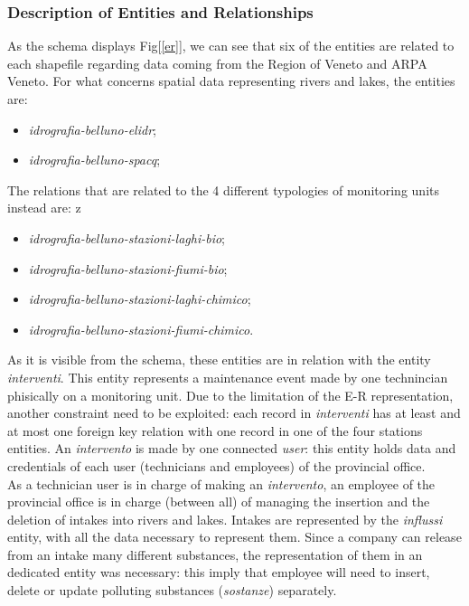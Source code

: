 \subsubsection{Description of Entities and Relationships}
As the schema displays Fig[\ref{er}], we can see that six of the entities are related to each shapefile regarding data coming from the Region of Veneto and ARPA Veneto.
For what concerns spatial data representing rivers and lakes, the entities are:
\begin{itemize}
    \item \textit{idrografia-belluno-elidr};
    \item \textit{idrografia-belluno-spacq};
\end{itemize}
The relations that are related to the 4 different typologies of monitoring units instead are:
z\begin{itemize}
    \item \textit{idrografia-belluno-stazioni-laghi-bio};
    \item \textit{idrografia-belluno-stazioni-fiumi-bio};
    \item \textit{idrografia-belluno-stazioni-laghi-chimico};
    \item \textit{idrografia-belluno-stazioni-fiumi-chimico}.
\end{itemize}
As it is visible from the schema, these entities are in relation with the entity \textit{interventi}. This entity represents a maintenance event made by one technincian phisically on a monitoring unit. Due to the limitation of the E-R representation, another constraint need to be exploited: each record in \textit{interventi} has at least and at most one foreign key relation with one record in one of the four stations entities.
An \textit{intervento} is made by one connected \textit{user}: this entity holds data and credentials of each user (technicians and employees) of the provincial office. \\
As a technician user is in charge of making an \textit{intervento}, an employee of the provincial office is in charge (between all) of managing the insertion and the deletion of intakes into rivers and lakes. Intakes are represented by the \textit{influssi} entity, with all the data necessary to represent them. Since a company can release from an intake many different substances, the representation of them in an dedicated entity was necessary: this imply that employee will need to insert, delete or update polluting substances (\textit{sostanze}) separately. \\

